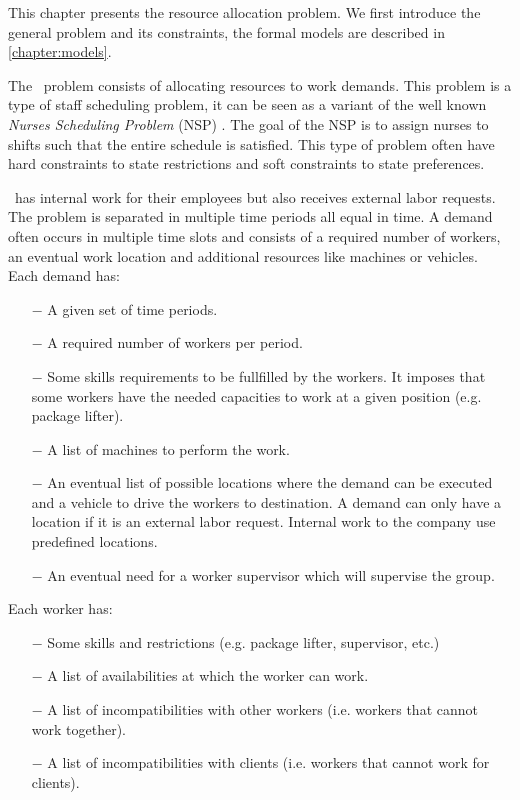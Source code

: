 \documentclass[../thesis.tex]{subfiles}
\begin{document}
This chapter presents the resource allocation problem.
We first introduce the general problem and its constraints, 
the formal models are described in \autoref{chapter:models}.

The \vone\ problem consists of allocating resources to work demands.
This problem is a type of staff scheduling problem, it can be seen as a variant of the 
well known \emph{Nurses Scheduling Problem} (NSP) \cite{Burke2004}. The goal of the NSP is to assign 
nurses to shifts such that the entire schedule is satisfied. 
This type of problem often have hard constraints to state restrictions 
and soft constraints to state preferences. 

\vone\ has internal work for their employees but also receives 
external labor requests. The problem is separated in multiple time periods all equal in time.
A demand often occurs in multiple time slots and consists of a required number of workers, an eventual 
work location and additional resources like machines or vehicles. Each demand has:

\begin{itemize}
  \item[$-$] A given set of time periods.
  \item[$-$] A required number of workers per period.
  \item[$-$] Some skills requirements to be fullfilled by the workers. 
  It imposes that some workers have the needed capacities to work at a given position (e.g. package lifter).
  \item[$-$] A list of machines to perform the work.
  \item[$-$] An eventual list of possible locations where the demand can be executed and a vehicle to drive the workers to destination.
  A demand can only have a location if it is an external labor request. Internal work to the company use predefined locations.
  \item[$-$] An eventual need for a worker supervisor which will supervise the group.
\end{itemize}


Each worker has:

\begin{itemize}
  \item[$-$] Some skills and restrictions (e.g. package lifter, supervisor, etc.)
  \item[$-$] A list of availabilities at which the worker can work.
  \item[$-$] A list of incompatibilities with other workers (i.e. workers that cannot work together).
  \item[$-$] A list of incompatibilities with clients (i.e. workers that cannot work for clients).
\end{itemize}
\end{document}
